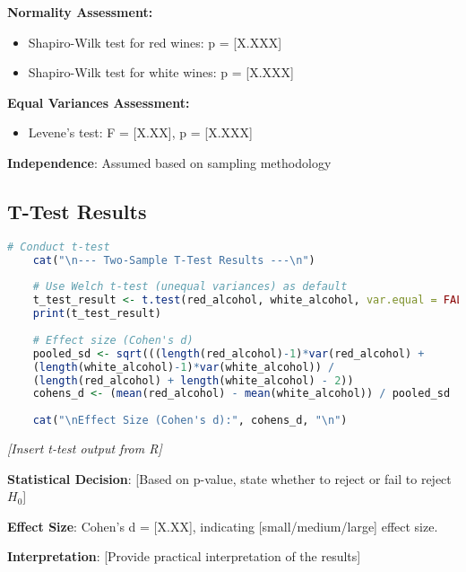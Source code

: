 \textbf{Normality Assessment:}
\begin{itemize}
	\item Shapiro-Wilk test for red wines: p = [X.XXX]
	\item Shapiro-Wilk test for white wines: p = [X.XXX]
\end{itemize}

\textbf{Equal Variances Assessment:}
\begin{itemize}
	\item Levene's test: F = [X.XX], p = [X.XXX]
\end{itemize}

\textbf{Independence}: Assumed based on sampling methodology

\subsection{T-Test Results}

\begin{lstlisting}[language=R, caption=Two-Sample T-Test, breaklines=true]
	# Conduct t-test
	cat("\n--- Two-Sample T-Test Results ---\n")
	
	# Use Welch t-test (unequal variances) as default
	t_test_result <- t.test(red_alcohol, white_alcohol, var.equal = FALSE)
	print(t_test_result)
	
	# Effect size (Cohen's d)
	pooled_sd <- sqrt(((length(red_alcohol)-1)*var(red_alcohol) + 
	(length(white_alcohol)-1)*var(white_alcohol)) / 
	(length(red_alcohol) + length(white_alcohol) - 2))
	cohens_d <- (mean(red_alcohol) - mean(white_alcohol)) / pooled_sd
	
	cat("\nEffect Size (Cohen's d):", cohens_d, "\n")
\end{lstlisting}

\textit{[Insert t-test output from R]}

\textbf{Statistical Decision}: 
[Based on p-value, state whether to reject or fail to reject $H_0$]

\textbf{Effect Size}: Cohen's d = [X.XX], indicating [small/medium/large] effect size.

\textbf{Interpretation}: [Provide practical interpretation of the results]